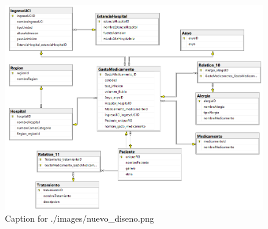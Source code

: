 \documentclass{article}
\begin{document}
\begin{figure}[H]
  \centering
  \includegraphics[width=\linewidth]{./images/nuevo_diseno.png}
  \caption{Caption for ./images/nuevo_diseno.png}
\end{figure}
\end{document}
